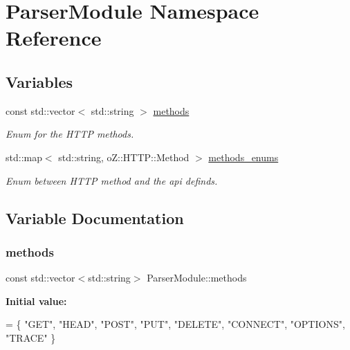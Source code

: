 \hypertarget{namespace_parser_module}{}\section{Parser\+Module Namespace Reference}
\label{namespace_parser_module}
\subsection*{Variables}
\begin{DoxyCompactItemize}
\item 
const std\+::vector$<$ std\+::string $>$ \hyperlink{namespace_parser_module_a937e2668b9b022b39ae69bf8169ef491}{methods}
\begin{DoxyCompactList}\small\item\em Enum for the H\+T\+TP methods. \end{DoxyCompactList}\item 
std\+::map$<$ std\+::string, o\+Z\+::\+H\+T\+T\+P\+::\+Method $>$ \hyperlink{namespace_parser_module_a4a564d139a12507911cf117e50ca1633}{methods\+\_\+enums}
\begin{DoxyCompactList}\small\item\em Enum between H\+T\+TP method and the api definds. \end{DoxyCompactList}\end{DoxyCompactItemize}


\subsection{Variable Documentation}
\mbox{\label{namespace_parser_module_a937e2668b9b022b39ae69bf8169ef491}} 
\subsubsection{\texorpdfstring{methods}{methods}}
{\footnotesize\ttfamily const std\+::vector$<$std\+::string$>$ Parser\+Module\+::methods}

{\bfseries Initial value\+:}
\begin{DoxyCode}
= \{
        \textcolor{stringliteral}{"GET"},
        \textcolor{stringliteral}{"HEAD"},
        \textcolor{stringliteral}{"POST"},
        \textcolor{stringliteral}{"PUT"},
        \textcolor{stringliteral}{"DELETE"},
        \textcolor{stringliteral}{"CONNECT"},
        \textcolor{stringliteral}{"OPTIONS"},
        \textcolor{stringliteral}{"TRACE"}
    \}
\end{DoxyCode}


